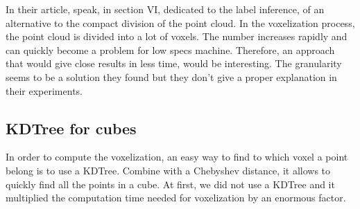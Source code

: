 In their article, \citeauthor*{7900038} speak, in section VI, dedicated to the label inference, of an alternative to the compact division of the point cloud. In the voxelization process, the point cloud is divided into a lot of voxels. The number increases rapidly and can quickly become a problem for low specs machine. Therefore, an approach that would give close results in less time, would be interesting. The granularity seems to be a solution they found but they don't give a proper explanation in their experiments.

\subsection{KDTree for cubes}

In order to compute the voxelization, an easy way to find to which voxel a point belong is to use a KDTree. Combine with a Chebyshev distance, it allows to quickly find all the points in a cube.
At first, we did not use a KDTree and it multiplied the computation time needed for voxelization by an enormous factor.

